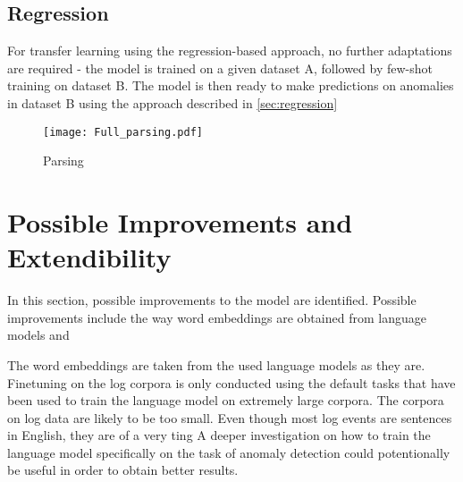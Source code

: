 \subsection{Regression \label{sec:transfer_regression}}
For transfer learning using the regression-based approach, no further adaptations are required - the model is trained on a given dataset A, followed by few-shot training on dataset B. The model is then ready to make predictions on anomalies in dataset B using the approach described in \ref{sec:regression}


\begin{figure}[htb]
  \centering
  \texttt{[image: Full\_parsing.pdf]}\\
  \caption{Parsing }
  \label{fig:Full pre-processing workflow}
\end{figure}


\section{Possible Improvements and Extendibility\label{sec:improvements}}
In this section, possible improvements to the model are identified. Possible improvements include the way word embeddings are obtained from language models and 

The word embeddings are taken from the used language models as they are. Finetuning on the log corpora is only conducted using the default tasks that have been used to train the language model on extremely large corpora. The corpora on log data are likely to be too small. Even though most log events are sentences in English, they are of a very ting A deeper investigation on how to train the language model specifically on the task of anomaly detection could potentionally be useful in order to obtain better results.





